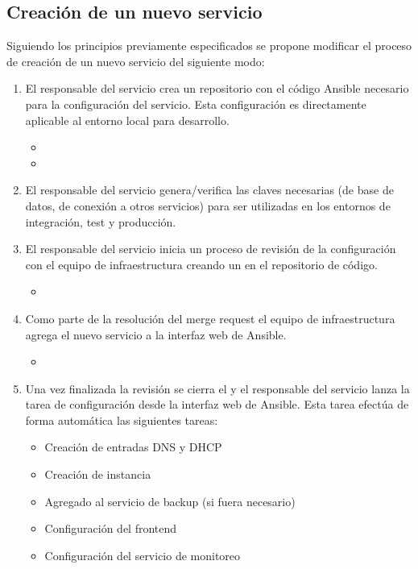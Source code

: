 \subsection{Creación de un nuevo servicio}

Siguiendo los principios previamente especificados se propone
modificar el proceso de creación de un nuevo servicio del siguiente
modo:

\begin{enumerate}
\item El responsable del servicio crea un repositorio con el código
  Ansible necesario para la configuración del servicio. Esta
  configuración es directamente aplicable al entorno local para
  desarrollo.
\begin{itemize}
\item {}
\item {}
\end{itemize}
\item El responsable del servicio genera/verifica las claves
  necesarias (de base de datos, de conexión a otros servicios) para
  ser utilizadas en los entornos de integración, test y producción.
\item El responsable del servicio inicia un proceso de revisión de la
  configuración con el equipo de infraestructura creando un
   en el repositorio de código.
\begin{itemize}
\item {}
\end{itemize}
\item Como parte de la resolución del merge request el equipo de
  infraestructura agrega el nuevo servicio a la interfaz web de
  Ansible.
\begin{itemize}
\item {}
\end{itemize}
\item Una vez finalizada la revisión se cierra el  y el responsable del servicio lanza la tarea de
  configuración desde la interfaz web de Ansible. Esta tarea efectúa
  de forma automática las siguientes tareas:
\begin{itemize}
\item Creación de entradas DNS y DHCP
\item Creación de instancia
\item Agregado al servicio de backup (si fuera necesario)
\item Configuración del frontend
\item Configuración del servicio de monitoreo
\end{itemize}
\end{enumerate}

